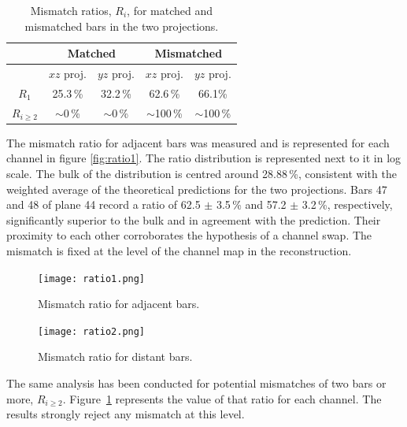 \documentclass[a4paper,11pt]{article}
\begin{document}
\begin{table}[!h]
 \centering
 \begin{tabular}{c|c|c|c|c}
  & \multicolumn{2}{c|}{Matched} & \multicolumn{2}{c}{Mismatched}  \\
  \hline
  & $xz$ proj. & $yz$ proj. & $xz$ proj. & $yz$ proj. \\
  \hline
  $R_1$ & 25.3\,\% & 32.2\,\% & 62.6\,\% & 66.1\%  \\
  $R_{i\geq2}$ & $\sim$0\,\% & $\sim$0\,\% & $\sim$100\,\% & $\sim$100\,\%
 \end{tabular}
 \caption{Mismatch ratios, $R_i$, for matched and mismatched bars in the two projections.}
 \label{tab:mismatch_ratio}
\end{table}

The mismatch ratio for adjacent bars was measured and is represented for each channel in figure \ref{fig:ratio1}. The ratio distribution is represented next
to it in log scale. The bulk of the distribution is centred around 28.88\,\%, consistent with the weighted average of the theoretical predictions for the two
projections. Bars 47  and 48 of plane 44 record a ratio of 62.5 $\pm$ 3.5\,\% and 57.2 $\pm$ 3.2\,\%, respectively, significantly superior to the bulk and in
agreement with the prediction. Their proximity to each other corroborates the hypothesis of a channel swap. The mismatch is fixed at the level of the channel
map in the reconstruction.

\begin{figure}[htr!]
  \begin{minipage}[b]{.49\textwidth}
   \centering
   \texttt{[image: ratio1.png]}
   \caption{Mismatch ratio for adjacent bars.}
   \label{fig:ratio1}
  \end{minipage}
  \begin{minipage}[b]{.49\textwidth}
   \centering
   \texttt{[image: ratio2.png]}
   \caption{Mismatch ratio for distant bars.}
   \label{fig:ratio2}
  \end{minipage}
\end{figure}

The same analysis has been conducted for potential mismatches of two bars or more, $R_{i\geq2}$. Figure~\ref{fig:ratio2} represents the value of that ratio
for each channel. The results strongly reject any mismatch at this level.
\end{document}
